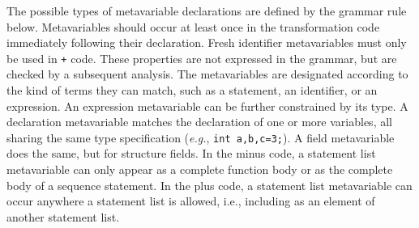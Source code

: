 The possible types of metavariable declarations are defined by the grammar
rule below.  Metavariables should occur at least once in the transformation
code immediately following their declaration.  Fresh identifier
metavariables must only be used in {\tt +} code.  These properties are not
expressed in the grammar, but are checked by a subsequent analysis.  The
metavariables are designated according to the kind of terms they can match,
such as a statement, an identifier, or an expression.  An expression
metavariable can be further constrained by its type.  A declaration
metavariable matches the declaration of one or more variables, all sharing
the same type specification ({\em e.g.}, {\tt int a,b,c=3;}).  A field
metavariable does the same, but for structure fields.  In the minus code, a
statement list metavariable can only appear as a complete function body or
as the complete body of a sequence statement.  In the plus code, a
statement list metavariable can occur anywhere a statement list is allowed,
i.e., including as an element of another statement list.

